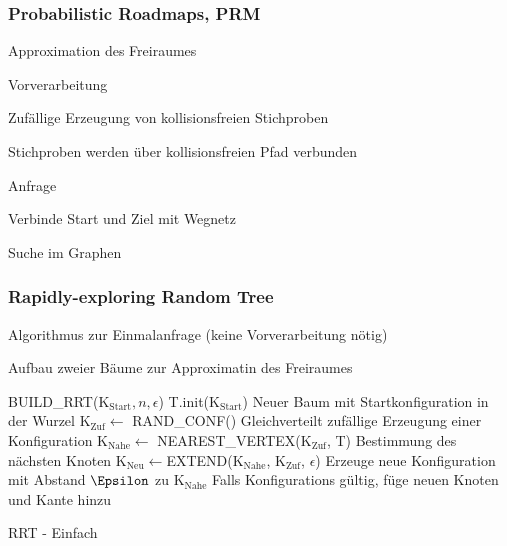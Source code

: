 \subsubsection{Probabilistic Roadmaps, PRM}
\begin{compactitem}
    \item Approximation des Freiraumes
\end{compactitem}
\begin{compactenum}
    \item Vorverarbeitung
    \begin{compactitem}
        \item Zufällige Erzeugung von kollisionsfreien Stichproben
        \item Stichproben werden über kollisionsfreien Pfad verbunden
    \end{compactitem}
    \item Anfrage
    \begin{compactitem}
        \item Verbinde Start und Ziel mit Wegnetz
        \item Suche im Graphen
    \end{compactitem}
\end{compactenum}

\subsubsection{Rapidly-exploring Random Tree}
\begin{compactitem}
    \item Algorithmus zur Einmalanfrage (keine Vorverarbeitung nötig)
    \item Aufbau zweier Bäume zur Approximatin des Freiraumes
\end{compactitem}

\begin{algorithm}[H]
    \begin{algorithmic}
        \State BUILD\_RRT(K$_\text{Start},n,\epsilon$)
        \State T.init(K$_\text{Start}$) Neuer Baum mit Startkonfiguration in der Wurzel
        \State K$_\text{Zuf} \leftarrow$ RAND\_CONF() Gleichverteilt zufällige Erzeugung einer Konfiguration
        \State K$_\text{Nahe} \leftarrow$ NEAREST\_VERTEX(K$_\text{Zuf}$, T) Bestimmung des nächsten Knoten
        \State K$_\text{Neu} \leftarrow$EXTEND(K$_\text{Nahe}$, K$_\text{Zuf}$, $\epsilon$) Erzeuge neue Konfiguration mit Abstand $\Epsilon$ zu K$_\text{Nahe}$
        \State Falls Konfigurations gültig, füge neuen Knoten und Kante hinzu
        \EndFor
        \caption{RRT - Einfach}
    \end{algorithmic}
\end{algorithm}

